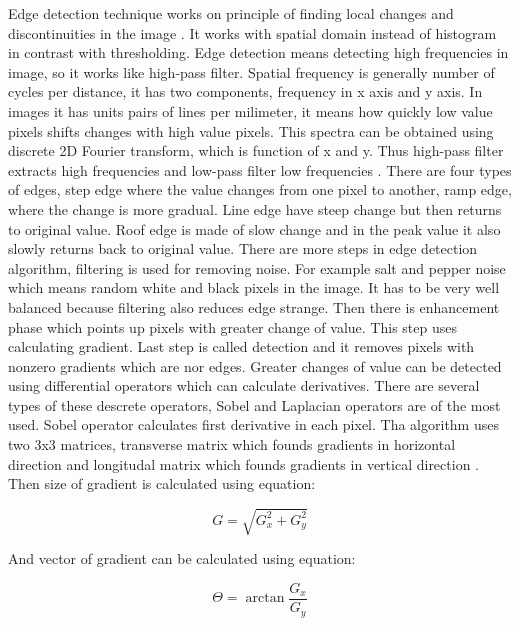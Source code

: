         Edge detection technique works on principle of finding local changes and discontinuities in the image \cite{22}. It works with spatial domain instead of histogram in contrast with thresholding.
        Edge detection means detecting high frequencies in image, so it works like high-pass filter. Spatial frequency is generally number of cycles per distance, it has two components,
        frequency in x axis and y axis. In images it has units pairs of lines per milimeter, it means how quickly low value pixels shifts changes with high value pixels.
        This spectra can be obtained using discrete 2D Fourier transform, which is function of x and y. Thus high-pass filter extracts high frequencies and low-pass filter low frequencies \cite{23}.
        There are four types of edges, step edge where the value changes from one pixel to another, ramp edge, where the change is more gradual. Line edge have steep change
        but then returns to original value. Roof edge is made of slow change and in the peak value it also slowly returns back to original value.
        There are more steps in edge detection algorithm, filtering is used for removing noise. For example salt and pepper noise
        which means random white and black pixels in the image. It has to be very well balanced because filtering also reduces edge strange.
        Then there is enhancement phase which points up pixels with greater change of value. This step uses calculating gradient. Last step is called detection
        and it removes pixels with nonzero gradients which are nor edges. \cite{3} Greater changes of value can be detected using differential operators which can calculate derivatives.
        There are several types of these descrete operators, Sobel and Laplacian operators are of the most used. Sobel operator calculates first derivative in each pixel.
        Tha algorithm uses two 3x3 matrices, transverse matrix which founds gradients in horizontal direction and longitudal matrix which founds gradients in vertical direction \cite{17, 22}.
        Then size of gradient is calculated using equation:

        \begin{equation}
            G = \sqrt{G_x^2 + G_y^2}
        \end{equation}
        \cite{22}
        
        And vector of gradient can be calculated using equation:

        \begin{equation}
            \Theta = \arctan{\frac{G_x}{G_y}}
        \end{equation}
        \cite{22}

